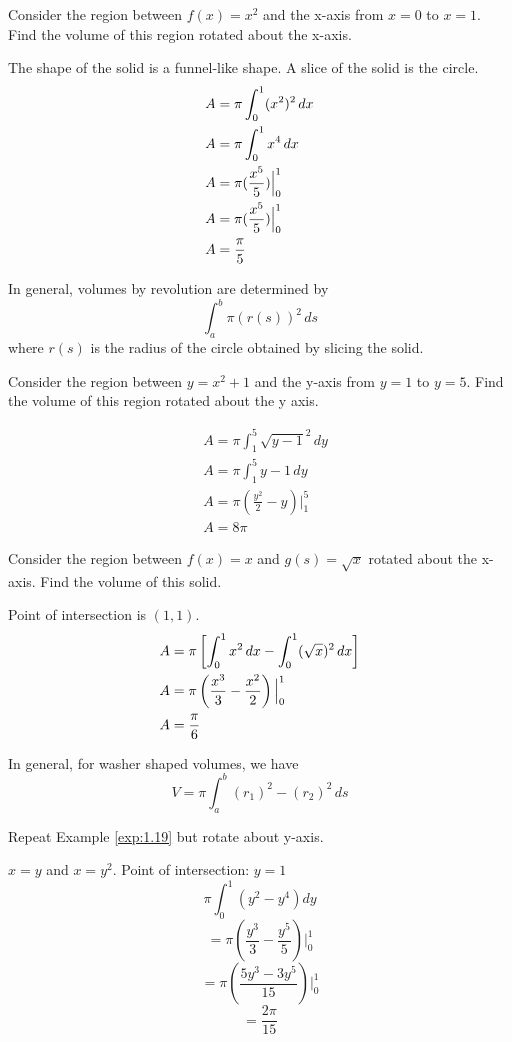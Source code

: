 \documentclass[english, 12pt]{article}
\begin{document}
\begin{exmp}
Consider the region between $f(x) = x^2$ and the x-axis from $x=0$ to $x=1$. Find the volume of this region rotated about the x-axis.
\begin{sol}
The shape of the solid is a funnel-like shape. A slice of the solid is the circle.
\begin{align*}
& A=\pi \int_0^1 (x^2)^2\,dx \\
& A=\pi \int_0^1 x^4\,dx \\
& A= \pi (\frac{x^5}{5})\Big|_0^1\\
& A= \pi (\frac{x^5}{5})\Big|_0^1\\
& A= \frac{\pi}{5}
\end{align*}
\end{sol}
\end{exmp}
In general, volumes by revolution are determined by \[ \int_a^b \pi (r(s))^2\,ds \]
where $r(s)$ is the radius of the circle obtained by slicing the solid.
\begin{exmp}
Consider the region between $y=x^2+1$ and the y-axis from $y=1$ to $y=5$. Find the volume of this region rotated about the y axis.
\begin{sol}
\begin{align*}
& A= \pi \int_1^5 \sqrt{y-1}^2\,dy \\
& A = \pi \int_1^5 y-1\,dy \\
& A = \pi (\frac{y^2}{2} - y)\Big|_1^5\\
& A = 8 \pi
\end{align*}
\end{sol}
\end{exmp}
\begin{exmp}\label{exp:1.19}
Consider the region between $f(x)=x$ and $g(s)=\sqrt x$ rotated about the x-axis. Find the volume of this solid.
\begin{sol}
Point of intersection is $(1,1)$.
\begin{align*}
& A = \pi\left[\int_0^1  x^2\,dx - \int_0^1 (\sqrt x)^2\,dx\right]\\
& A = \pi \left(\frac{x^3}{3} - \frac{x^2}{2}\right)\Big|_{0}^{1}\\
& A = \frac{\pi}{6}
\end{align*}
\end{sol}
\end{exmp}

In general, for washer shaped volumes, we have \\
\[ V = \pi \int_a^b  (r_{1})^2 - (r_{2})^2\,ds\]
\begin{exercise}
Repeat Example \ref{exp:1.19} but rotate about y-axis.
\begin{sol}
$x=y$ and $x=y^2$. Point of intersection: $ y=1$
\[ \pi \int_0^1 (y^2 - y^4) dy \]
\[ =\pi (\frac{y^3}{3} - \frac{y^5}{5})\Big|_0^1 \] 
\[ =\pi (\frac{5y^3-3y^5}{15})\Big|_0^1 \] 
\[ =\frac{2 \pi}{15} \]
\end{sol}
\end{exercise}
\end{document}
